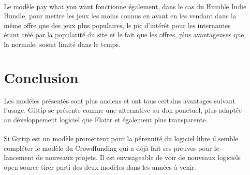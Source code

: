 \paragraph{}
Le modèle pay what you want fonctionne également, dans le cas du Humble Indie
Bundle, pour mettre les jeux les moins connus en avant en les vendant dans la
même offre que des jeux plus populaires, le pic d'intérêt pour les internautes
étant créé par la popularité du site et le fait que les offres, plus
avantageuses que la normale, soient limité dans le temps.

\section{Conclusion}
Les modèles présentés sont plus anciens et ont tous certains avantages suivant
l'usage. Gittip se présente comme une alternative au don ponctuel, plus adaptée
au développement logiciel que Flattr et également plus transparente.

\paragraph{}
Si Gittip est un modèle prometteur pour la pérennité du logiciel libre il
semble compléter le modèle du Crowdfunding qui a déjà fait ses preuves pour le
lancement de nouveaux projets. Il est envisageable de voir de nouveaux
logiciels open source tirer parti des deux modèles dans les années à venir.
